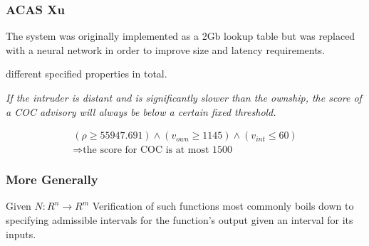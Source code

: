 \documentclass{beamer}
\begin{document}
\begin{frame}
\frametitle{ACAS Xu}
The system was originally implemented as a 2Gb lookup table but was replaced with a neural network in order to improve size and latency requirements.

 different specified properties in total.

\pause
\begin{definition}
\emph{If the intruder is distant and is significantly slower than the ownship, the score of a COC advisory will always be below a certain fixed threshold.}
\end{definition}

\pause
\begin{block}{}
\begin{equation*}
\begin{array}{l}
(\rho \geq 55947.691) \wedge
(v_{own} \geq 1145) \wedge (v_{int} \leq 60)  \\
\Rightarrow \text{the score for COC is at most 1500}
\end{array}
\end{equation*}
\end{block}

\end{frame}

    \begin{frame}
    \frametitle{More Generally}

    \begin{block}{Given $N : R^n \rightarrow R^m$}
    Verification of such functions most commonly boils down to specifying admissible intervals for the function's output given an interval for its inputs.
\end{block}

    \end{frame}
\end{document}
